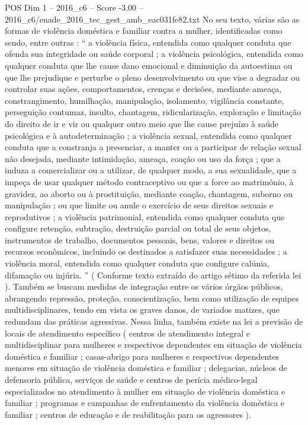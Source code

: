 \begin{textsample}{POS Dim 1 – 2016\_c6 – Score -3.00 – 2016\_c6/enade\_2016\_tec\_gest\_amb\_eac031fe82.txt}
No seu texto, várias são as formas de violência doméstica e familiar contra a mulher, identificadas como sendo, entre outras : “ a violência física, entendida como qualquer conduta que ofenda sua integridade ou saúde corporal ; a violência psicológica, entendida como qualquer conduta que lhe cause dano emocional e diminuição da autoestima ou que lhe prejudique e perturbe o pleno desenvolvimento ou que vise a degradar ou controlar suas ações, comportamentos, crenças e decisões, mediante ameaça, constrangimento, humilhação, manipulação, isolamento, vigilância constante, perseguição contumaz, insulto, chantagem, ridicularização, exploração e limitação do direito de ir e vir ou qualquer outro meio que lhe cause prejuízo à saúde psicológica e à autodeterminação ; a violência sexual, entendida como qualquer conduta que a constranja a presenciar, a manter ou a participar de relação sexual não desejada, mediante intimidação, ameaça, coação ou uso da força ; que a induza a comercializar ou a utilizar, de qualquer modo, a sua sexualidade, que a impeça de usar qualquer método contraceptivo ou que a force ao matrimônio, à gravidez, ao aborto ou à prostituição, mediante coação, chantagem, suborno ou manipulação ; ou que limite ou anule o exercício de seus direitos sexuais e reprodutivos ; a violência patrimonial, entendida como qualquer conduta que configure retenção, subtração, destruição parcial ou total de seus objetos, instrumentos de trabalho, documentos pessoais, bens, valores e direitos ou recursos econômicos, incluindo os destinados a satisfazer suas necessidades ; a violência moral, entendida como qualquer conduta que configure calúnia, difamação ou injúria. ” ( Conforme texto extraído do artigo sétimo da referida lei ).
Também se buscam medidas de integração entre os vários órgãos públicos, abrangendo repressão, proteção, conscientização, bem como utilização de equipes multidisciplinares, tendo em vista os graves danos, de variados matizes, que redundam das práticas agressivas.
Nessa linha, também existe na lei a previsão de locais de atendimento específico ( centros de atendimento integral e multidisciplinar para mulheres e respectivos dependentes em situação de violência doméstica e familiar ; casas-abrigo para mulheres e respectivos dependentes menores em situação de violência doméstica e familiar ; delegacias, núcleos de defensoria pública, serviços de saúde e centros de perícia médico-legal especializados no atendimento à mulher em situação de violência doméstica e familiar ; programas e campanhas de enfrentamento da violência doméstica e familiar ; centros de educação e de reabilitação para os agressores ).

\end{textsample}
